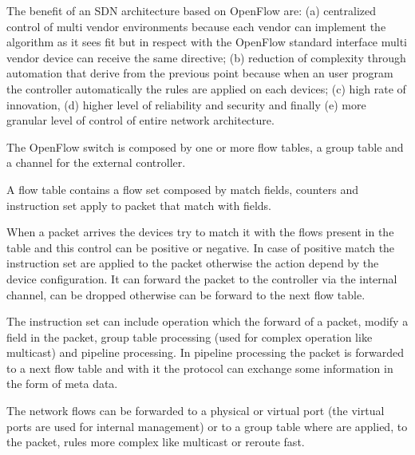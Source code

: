 The benefit of an \ac{SDN} architecture based on OpenFlow are: (a) centralized control of multi vendor environments because each vendor can implement the algorithm as it sees fit but in respect with the OpenFlow standard interface multi vendor device can receive the same directive; (b) reduction of complexity through automation that derive from the previous point because when an user program the controller automatically the rules are applied on each devices; (c) high rate of innovation, (d) higher level of reliability and security and finally (e) more granular level of control of entire network architecture.

The OpenFlow switch is composed by one or more flow tables, a group table and a channel for the external controller.

A flow table contains a flow set composed by match fields, counters and instruction set apply to packet that match with fields.

When a packet arrives the devices try to match it with the flows present in the table and this control can be positive or negative. In case of positive match the instruction set are applied to the packet otherwise the action depend by the device configuration. It can forward the packet to the controller via the internal channel, can be dropped otherwise can be forward to the next flow table.

The instruction set can include operation which the forward of a packet, modify a field in the packet, group table processing (used for complex operation like multicast) and pipeline processing. In pipeline processing the packet is forwarded to a next flow table and with it the protocol can exchange some information in the form of meta data.

The network flows can be forwarded to a physical or virtual port (the virtual ports are used for internal management) or to a group table where are applied, to the packet, rules more complex like multicast or reroute fast.
